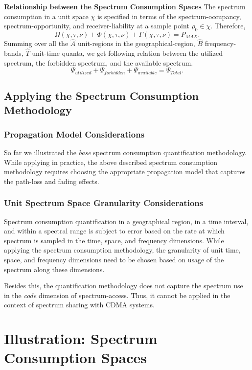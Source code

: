 \documentclass[journal,12pt,draftclsnofoot,onecolumn]{IEEEtran}
\begin{document}
\noindent
\textbf{Relationship between the Spectrum Consumption Spaces}
The spectrum consumption in a unit space $\chi$ is specified in terms of the spectrum-occupancy, spectrum-opportunity, and receiver-liability at a sample point $\rho_0 \in \chi$. Therefore,
\begin{equation}
{\Omega}(\chi, \tau, \nu) + {\Phi}(\chi, \tau, \nu)  + {\Gamma}(\chi, \tau, \nu)	= P_{MAX} .
\end{equation}
Summing over all the $\hat{A}$ unit-regions in the geographical-region, $\hat{B}$ frequency-bands, $\hat{T}$ unit-time quanta, we get following relation between the utilized spectrum, the forbidden spectrum, and the available spectrum.
\begin{equation}
\label{eq:p1e_sp_csm_reln}
\Psi_{utilized} + \Psi_{forbidden} + \Psi_{available}  = \Psi_{Total} .
\end{equation}

\subsection{Applying the Spectrum Consumption Methodology}

\subsubsection{Propagation Model Considerations}
So far we illustrated the \textit{base} spectrum consumption quantification methodology. While applying in practice, the above described spectrum consumption methodology requires choosing the appropriate propagation model that captures the path-loss and fading effects. 
\subsubsection{Unit Spectrum Space Granularity Considerations}
Spectrum consumption quantification in a geographical region, in a time interval, and within a spectral range is subject to error based on the rate at which spectrum is sampled in the time, space, and frequency dimensions. While applying the spectrum consumption methodology, the granularity of unit time, space, and frequency dimensions need to be chosen based on usage of the spectrum along these dimensions.

Besides this, the quantification methodology does not capture the spectrum use in the \textit{code} dimension of spectrum-access. Thus, it cannot be applied in the context of spectrum sharing with CDMA systems.
\section{Illustration: Spectrum Consumption Spaces}
\end{document}
